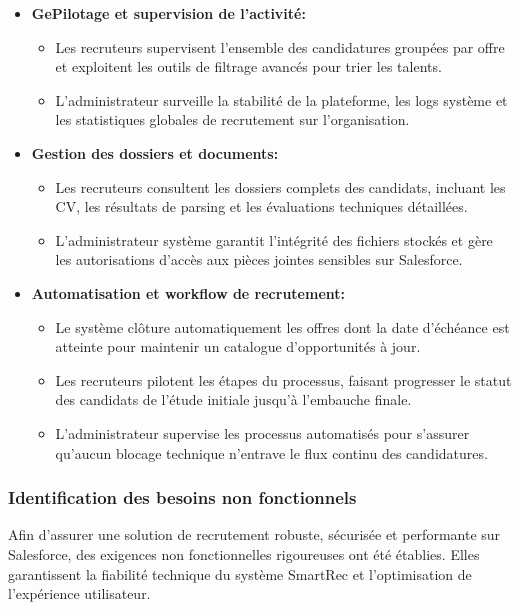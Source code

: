 \begin{itemize}
    \item \textbf{GePilotage et supervision de l'activité:}
    \begin{itemize}
        \item[--] Les recruteurs supervisent l'ensemble des candidatures groupées par offre et exploitent les outils de filtrage avancés pour trier les talents.
        \item[--]  L'administrateur surveille la stabilité de la plateforme, les logs système et les statistiques globales de recrutement sur l'organisation.
    \end{itemize}
\hspace{0.5cm}
    
    \item \textbf{Gestion des dossiers et documents:}
    \begin{itemize}
        \item[--] Les recruteurs consultent les dossiers complets des candidats, incluant les CV, les résultats de parsing et les évaluations techniques détaillées.
        \item[--] L'administrateur système garantit l'intégrité des fichiers stockés et gère les autorisations d'accès aux pièces jointes sensibles sur Salesforce.
    \end{itemize}
\hspace{0.5cm}


    \item \textbf{Automatisation et workflow de recrutement:}
    \begin{itemize}
        \item[--] Le système clôture automatiquement les offres dont la date d'échéance est atteinte pour maintenir un catalogue d'opportunités à jour.
        \item[--] Les recruteurs pilotent les étapes du processus, faisant progresser le statut des candidats de l'étude initiale jusqu'à l'embauche finale.
        \item[--]  L'administrateur supervise les processus automatisés pour s'assurer qu'aucun blocage technique n'entrave le flux continu des candidatures.
    \end{itemize}
    
\end{itemize}



\subsubsection{Identification des besoins non fonctionnels}
Afin d'assurer une solution de recrutement robuste, sécurisée et performante sur Salesforce, des exigences non fonctionnelles rigoureuses ont été établies. Elles garantissent la fiabilité technique du système SmartRec et l'optimisation de l'expérience utilisateur.

